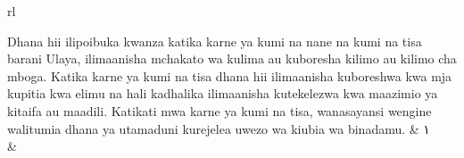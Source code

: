 \documentclass[a4paper, 12pt]{report}
\begin{document}
\begin{longtable}{{rl}} 

\textarabic{Dhana hii ilipoibuka kwanza katika karne ya kumi na nane na kumi na tisa barani Ulaya, ilimaanisha mchakato wa kulima au kuboresha kilimo au kilimo cha mboga. Katika karne ya kumi na tisa dhana hii ilimaanisha kuboreshwa kwa mja kupitia kwa elimu na hali kadhalika ilimaanisha kutekelezwa kwa maazimio ya kitaifa au maadili. Katikati mwa karne ya kumi na tisa, wanasayansi wengine walitumia dhana ya utamaduni kurejelea uwezo wa kiubia wa binadamu.} & \textarabic{١} \\* 
 & \\* 
\end{longtable}

\begin{longtable}{r}
 \\  %

\end{longtable}
\end{document}
